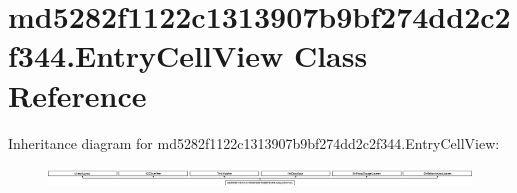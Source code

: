 \hypertarget{classmd5282f1122c1313907b9bf274dd2c2f344_1_1EntryCellView}{}\section{md5282f1122c1313907b9bf274dd2c2f344.\+Entry\+Cell\+View Class Reference}
\label{classmd5282f1122c1313907b9bf274dd2c2f344_1_1EntryCellView}
Inheritance diagram for md5282f1122c1313907b9bf274dd2c2f344.\+Entry\+Cell\+View\+:\begin{figure}[H]
\begin{center}
\leavevmode
\includegraphics[height=0.545809cm]{classmd5282f1122c1313907b9bf274dd2c2f344_1_1EntryCellView}
\end{center}
\end{figure}
